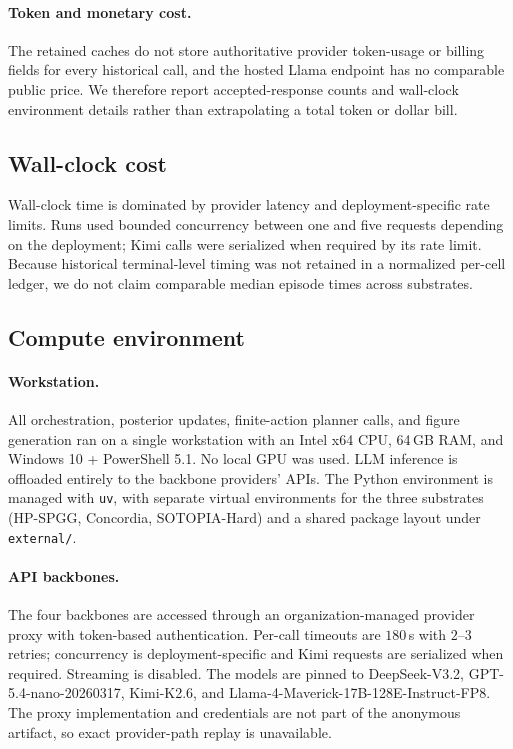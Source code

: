 \paragraph{Token and monetary cost.} The retained caches do not store authoritative provider token-usage or billing fields for every historical call, and the hosted Llama endpoint has no comparable public price. We therefore report accepted-response counts and wall-clock environment details rather than extrapolating a total token or dollar bill.

\subsection{Wall-clock cost}
\label{app:cost-wallclock}

Wall-clock time is dominated by provider latency and deployment-specific rate limits. Runs used bounded concurrency between one and five requests depending on the deployment; Kimi calls were serialized when required by its rate limit. Because historical terminal-level timing was not retained in a normalized per-cell ledger, we do not claim comparable median episode times across substrates.

\subsection{Compute environment}
\label{app:cost-hardware}

\paragraph{Workstation.} All orchestration, posterior updates, finite-action planner calls, and figure generation ran on a single workstation with an Intel x64 CPU, 64\,GB RAM, and Windows 10 + PowerShell 5.1. No local GPU was used. LLM inference is offloaded entirely to the backbone providers' APIs. The Python environment is managed with \texttt{uv}, with separate virtual environments for the three substrates (HP-SPGG, Concordia, SOTOPIA-Hard) and a shared package layout under \texttt{external/}.

\paragraph{API backbones.} The four backbones are accessed through an organization-managed provider proxy with token-based authentication. Per-call timeouts are $180$\,s with $2$--$3$ retries; concurrency is deployment-specific and Kimi requests are serialized when required. Streaming is disabled. The models are pinned to DeepSeek-V3.2, GPT-5.4-nano-20260317, Kimi-K2.6, and Llama-4-Maverick-17B-128E-Instruct-FP8. The proxy implementation and credentials are not part of the anonymous artifact, so exact provider-path replay is unavailable.

